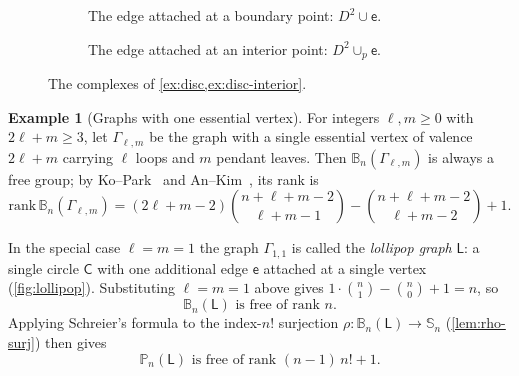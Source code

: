 \documentclass[reqno]{amsart}
\theoremstyle{definition}
\newtheorem{example}[theorem]{Example}
\newcommand{\PB}{\mathbb{P}}
\newcommand{\BG}{\mathbb{B}}
\newcommand{\Lollipop}{\mathsf{L}}
\numberwithin{equation}{section}
\begin{document}
\begin{figure}[ht]
\centering
\begin{subfigure}[b]{0.48\textwidth}
\centering
{}
\caption{The edge attached at a boundary point:
\(D^2\cup\mathsf{e}\).}
\label{fig:disc-boundary-edge}
\end{subfigure}
\hfill
\begin{subfigure}[b]{0.48\textwidth}
\centering
{}
\caption{The edge attached at an interior point:
\(D^2\cup_p\mathsf{e}\).}
\label{fig:disc-interior-edge}
\end{subfigure}
\caption{The complexes of \cref{ex:disc,ex:disc-interior}.}
\label{fig:disc-edges}
\end{figure}

\begin{example}[Graphs with one essential vertex]\label{ex:one-essential}
For integers \(\ell, m\geq 0\) with \(2\ell+m\ge 3\), let \(\Gamma_{\ell, m}\) be the graph
with a single essential vertex of valence \(2\ell + m\) carrying
\(\ell\) loops and \(m\) pendant leaves. Then \(\BG_n(\Gamma_{\ell, m})\)
is always a free group; by Ko--Park~\cite[Thm.~3.16]{KoPark2012}
and An--Kim~\cite[Prop.~3.8]{AnKim2026}, its rank is
\[
\mathrm{rank}\,\BG_n(\Gamma_{\ell, m})
=
(2\ell + m - 2)\binom{n + \ell + m - 2}{\ell + m - 1}
- \binom{n + \ell + m - 2}{\ell + m - 2}
+ 1.
\]

In the special case \(\ell = m = 1\) the graph \(\Gamma_{1,1}\) is called the
\emph{lollipop graph} \(\Lollipop\): a single circle \(\mathsf{C}\) with one additional edge
\(\mathsf{e}\) attached at a single vertex (\cref{fig:lollipop}). Substituting
\(\ell = m = 1\) above gives \(1\cdot\binom{n}{1} - \binom{n}{0} + 1= n\), so
\[
\BG_n(\Lollipop) \text{ is free of rank } n.
\]
Applying Schreier's formula to the index-\(n!\) surjection
\(\rho:\BG_n(\Lollipop)\rightarrow \mathbb{S}_n\)
(\cref{lem:rho-surj}) then gives
\[
\PB_n(\Lollipop) \text{ is free of rank }
(n-1)\,n! + 1.
\]
\end{example}
\end{document}
